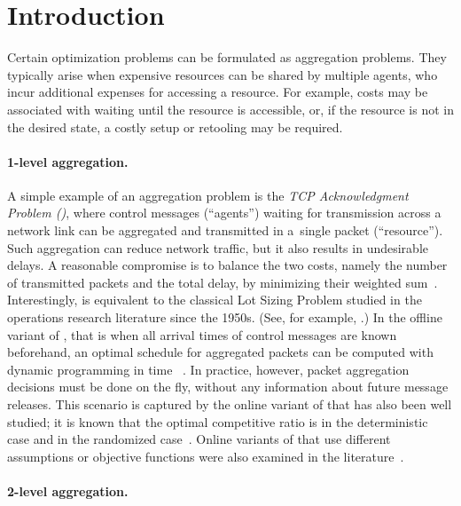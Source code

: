 \documentclass[a4paper]{article}
\begin{document}
\section{Introduction}
\label{sec: introduction}

Certain optimization problems can be formulated as aggregation problems. They
typically arise when expensive resources can be shared by multiple agents, who
incur additional expenses for accessing a resource. 
For example, costs may be associated with
waiting until the resource is accessible, or, if the resource is not in the
desired state, a costly setup or retooling may be required.


\paragraph{1-level aggregation.}

A simple example of an aggregation problem is the \emph{TCP Acknowledgment
Problem ()}, where control messages (``agents'') waiting for transmission across a
network link can be aggregated and transmitted in a~single packet (``resource''). 
Such aggregation can
reduce network traffic, but it also results in undesirable delays. A reasonable compromise
is to balance the two costs, namely the number of transmitted
packets and the total delay, by minimizing their weighted sum~\cite{tcp-ack-det-journal}.
Interestingly,  is equivalent to the classical Lot Sizing Problem studied in the operations research literature
since the 1950s. (See, for example, \cite{wagner_whitin_58}.) In the offline variant of , that is
when all arrival times of control messages are known beforehand, an optimal schedule for
aggregated packets can be computed with dynamic programming in time ~\cite{aggarwal_park_93}.
In practice, however, packet aggregation decisions must be done on the fly,
without any information about future message releases. This scenario is captured by the
online variant of  that has also been well studied; it is known that the optimal competitive
ratio is  in the deterministic case \cite{tcp-ack-det-journal}
and  in the randomized
case~\cite{tcp-ack,online-primal-dual-book,tcp-ack-lower-bound}.
Online variants of  that use different assumptions or objective functions 
were also examined in the literature~\cite{tcp-ack-logp,tcp-ack-long-delays}.


\paragraph{2-level aggregation.}
\end{document}
